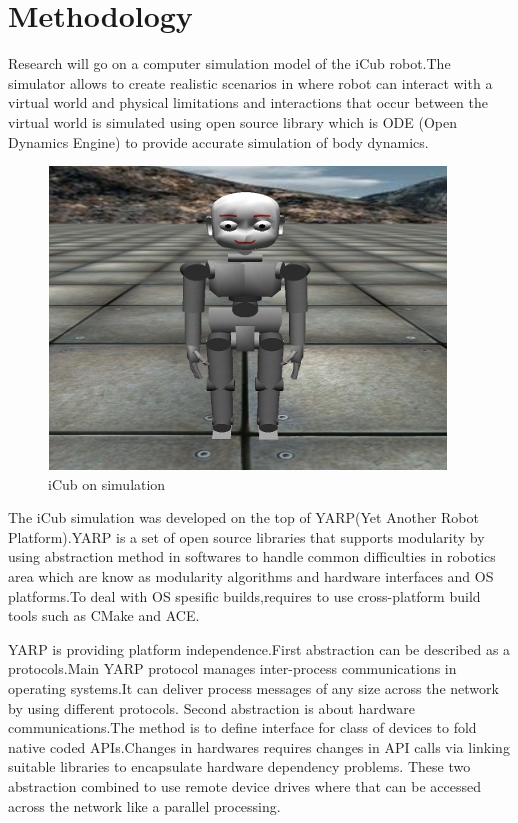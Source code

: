 \documentclass[12pt]{report}
\begin{document}
\chapter{Methodology}

Research will go on a computer simulation model of the iCub robot.The simulator allows to create realistic scenarios in where robot can interact with a virtual world and physical limitations and interactions that occur between the virtual world is simulated using open source library which is ODE (Open Dynamics Engine) to provide accurate simulation of body dynamics.
\begin{figure}[!h]
\begin{center}
\includegraphics[scale=1.3]{iCubSim.jpg}
\caption{iCub on simulation}
\end{center}
\end{figure}
The iCub simulation was developed on the top of YARP(Yet Another Robot Platform)\cite{yarp}.YARP is a set of open source libraries that supports modularity by using abstraction method in softwares to handle common difficulties in robotics area which are know as modularity algorithms and hardware interfaces and OS platforms.To deal with OS spesific builds,requires to use cross-platform build tools such as CMake\cite{cmake} and ACE\cite{ace}.

YARP is providing platform independence.First abstraction can be described as a protocols.Main YARP protocol manages inter-process communications in operating systems.It can deliver process messages of any size across the network by using different protocols.
\newpage
Second abstraction is about hardware communications.The method is to define interface for class of devices to fold native coded APIs.Changes in hardwares requires changes in API calls via linking suitable libraries to encapsulate hardware dependency problems.
These two abstraction combined to use remote device drives where that can be accessed across the network like a parallel processing.
\end{document}

